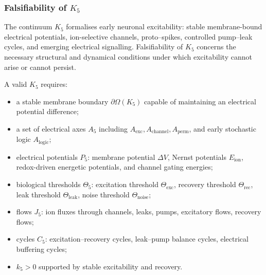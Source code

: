 
\subsubsection{Falsifiability of \texorpdfstring{$K_5$}{K_5}}
\label{sec:falsifiability-k5}

The continuum $K_5$ formalises early neuronal excitability:
stable membrane-bound electrical potentials, ion-selective channels,
proto–spikes, controlled pump–leak cycles, and emerging electrical
signalling.
Falsifiability of $K_5$ concerns the necessary structural and dynamical
conditions under which excitability cannot arise or cannot persist.

A valid $K_5$ requires:

\begin{itemize}
    \item a stable membrane boundary $\partial\Omega(K_5)$ capable
          of maintaining an electrical potential difference;
    \item a set of electrical axes $A_5$ including
          $A_{\mathrm{exc}}, A_{\mathrm{channel}}, A_{\mathrm{perm}}$,
          and early stochastic logic $A_{\mathrm{logic}}$;
    \item electrical potentials $P_5$:
          membrane potential $\Delta V$, Nernst potentials $E_{\mathrm{ion}}$,
          redox-driven energetic potentials, and channel gating energies;
    \item biological thresholds $\Theta_5$:
          excitation threshold $\Theta_{\mathrm{exc}}$,
          recovery threshold $\Theta_{\mathrm{rec}}$,
          leak threshold $\Theta_{\mathrm{leak}}$,
          noise threshold $\Theta_{\mathrm{noise}}$;
    \item flows $J_5$: ion fluxes through channels, leaks,
          pumps, excitatory flows, recovery flows;
    \item cycles $C_5$: excitation–recovery cycles,
          leak–pump balance cycles, electrical buffering cycles;
    \item $k_5>0$ supported by stable excitability and recovery.
\end{itemize}

